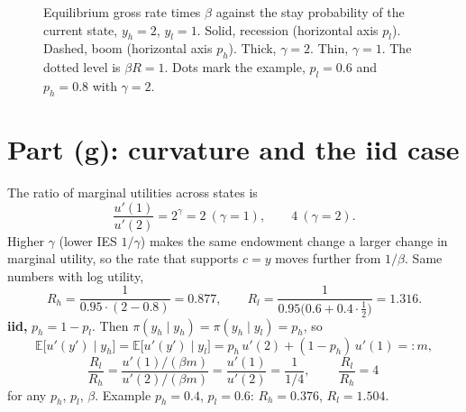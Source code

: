 \documentclass[12pt]{article}
\newcommand{\E}{\mathbb{E}}
\begin{document}
\begin{figure}[H]
\centering
{}
\caption{Equilibrium gross rate times $\beta$ against the stay probability
of the current state, $y_h=2$, $y_l=1$. Solid, recession (horizontal axis
$p_l$). Dashed, boom (horizontal axis $p_h$). Thick, $\gamma=2$. Thin,
$\gamma=1$. The dotted level is $\beta R=1$. Dots mark the example,
$p_l=0.6$ and $p_h=0.8$ with $\gamma=2$.}
\label{fig:R}
\end{figure}

\section*{Part (g): curvature and the iid case}

The ratio of marginal utilities across states is
\[
  \frac{u'(1)}{u'(2)}=2^{\gamma}=2\ (\gamma=1),\qquad 4\ (\gamma=2).
\]
Higher $\gamma$ (lower IES $1/\gamma$) makes the same endowment change a
larger change in marginal utility, so the rate that supports $c=y$ moves
further from $1/\beta$. Same numbers with log utility,
\[
  R_h=\frac1{0.95\cdot(2-0.8)}=0.877,\qquad R_l=\frac1{0.95\big(0.6+0.4\cdot\frac12\big)}=1.316 .
\]
\textbf{iid,} $p_h=1-p_l$. Then $\pi(y_h\mid y_h)=\pi(y_h\mid y_l)=p_h$, so
\[
  \E\big[u'(y')\mid y_h\big]=\E\big[u'(y')\mid y_l\big]=p_h\,u'(2)+(1-p_h)\,u'(1)=:m,
\]
\[
  \frac{R_l}{R_h}=\frac{u'(1)/(\beta m)}{u'(2)/(\beta m)}=\frac{u'(1)}{u'(2)}=\frac{1}{1/4},
  \qquad
  \boxed{\ \frac{R_l}{R_h}=4\ }
\]
for any $p_h$, $p_l$, $\beta$. Example $p_h=0.4$, $p_l=0.6$: $R_h=0.376$, $R_l=1.504$.
\end{document}
